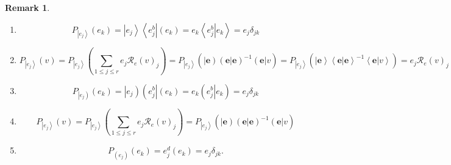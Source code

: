 \documentclass[aps,preprint]{revtex4}%
\newtheorem{remark}[theorem]{Remark}
\begin{document}
\begin{remark}
\begin{enumerate}
\item
\begin{equation}
P_{\left\vert e_{j}\right\rangle }\left(  e_{k}\right)  =\left\vert
e_{j}\right\rangle \left\langle e_{j}^{b}\right\vert \left(  e_{k}\right)
=e_{k}\left\langle \left.  e_{j}^{b}\right\vert e_{k}\right\rangle
=e_{j}\delta_{jk}%
\end{equation}


\item
\begin{equation}
P_{\left\vert e_{j}\right\rangle }\left(  v\right)  =P_{\left\vert
e_{j}\right\rangle }\left(  \sum_{1\leq j\leq r}e_{j}\mathcal{R}_{e}\left(
v\right)  _{j}\right)  =P_{\left\vert e_{j}\right\rangle }\left(  \left\vert
\mathbf{e}\right)  \left(  \left.  \mathbf{e}\right\vert \mathbf{e}\right)
^{-1}\left(  \mathbf{e}\right\vert v\right)  =P_{\left\vert e_{j}\right\rangle
}\left(  \left\vert \mathbf{e}\right\rangle \left\langle \left.
\mathbf{e}\right\vert \mathbf{e}\right\rangle ^{-1}\left\langle \left.
\mathbf{e}\right\vert v\right\rangle \right)  =e_{j}\mathcal{R}_{e}\left(
v\right)  _{j}%
\end{equation}


\item
\begin{equation}
P_{\left\vert e_{j}\right)  }\left(  e_{k}\right)  =\left\vert e_{j}\right)
\left(  e_{j}^{b}\right\vert \left(  e_{k}\right)  =e_{k}\left(  \left.
e_{j}^{b}\right\vert e_{k}\right)  =e_{j}\delta_{jk}%
\end{equation}


\item
\begin{equation}
P_{\left\vert e_{j}\right\rangle }\left(  v\right)  =P_{\left\vert
e_{j}\right\rangle }\left(  \sum_{1\leq j\leq r}e_{j}\mathcal{R}_{e}\left(
v\right)  _{j}\right)  =P_{\left\vert e_{j}\right\rangle }\left(  \left\vert
\mathbf{e}\right)  \left(  \left.  \mathbf{e}\right\vert \mathbf{e}\right)
^{-1}\left(  \mathbf{e}\right\vert v\right)
\end{equation}


\item
\begin{equation}
P_{\left(  e_{j}\right)  }\left(  e_{k}\right)  =e_{j}^{d}\left(
e_{k}\right)  =e_{j}\delta_{jk}.
\end{equation}

\end{enumerate}
\end{remark}
\end{document}
